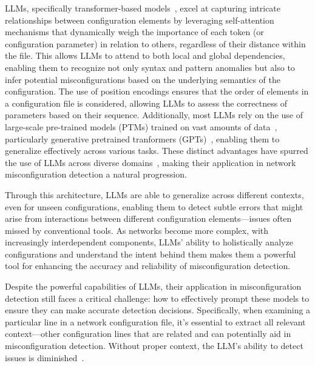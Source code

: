 LLMs, specifically transformer-based models~\cite{vaswani2017attention,hill2024transformers,lin2022survey}, excel at capturing intricate relationships between configuration elements by leveraging self-attention mechanisms that dynamically weigh the importance of each token (or configuration parameter) in relation to others, regardless of their distance within the file. This allows LLMs to attend to both local and global dependencies, enabling them to recognize not only syntax and pattern anomalies but also to infer potential misconfigurations based on the underlying semantics of the configuration. The use of position encodings ensures that the order of elements in a configuration file is considered, allowing LLMs to assess the correctness of parameters based on their sequence. Additionally, most LLMs rely on the use of large-scale pre-trained models (PTMs) trained on vast amounts of data~\cite{qiu2020pre}, particularly generative pretrained tranformers (GPTs)~\cite{achiam2023gpt,touvron2023llama,shanahan2024talking,taylor2023galactica,brown2020language,chowdhery2023palm}, enabling them to generalize effectively across various tasks.
These distinct advantages have spurred the use of LLMs across diverse domains~\cite{carion2020end,sheng2019nrtr,neil2020transformers,parmar2018image,chen2021developing,gulati2020conformer}, making their application in network misconfiguration detection a natural progression.

Through this architecture, LLMs are able to generalize across different contexts, even for unseen configurations, enabling them to detect subtle errors that might arise from interactions between different configuration elements—issues often missed by conventional tools. As networks become more complex, with increasingly interdependent components, LLMs' ability to holistically analyze configurations and understand the intent behind them makes them a powerful tool for enhancing the accuracy and reliability of misconfiguration detection.


Despite the powerful capabilities of LLMs, their application in misconfiguration detection still faces a critical challenge: how to effectively prompt these models to ensure they can make accurate detection decisions. Specifically, when examining a particular line in a network configuration file, it’s essential to extract all relevant context—other configuration lines that are related and can potentially aid in misconfiguration detection. Without proper context, the LLM’s ability to detect issues is diminished~\cite{liskavets2024prompt,tian2024examining,khurana2024and, shvartzshnaider2024llm}.

